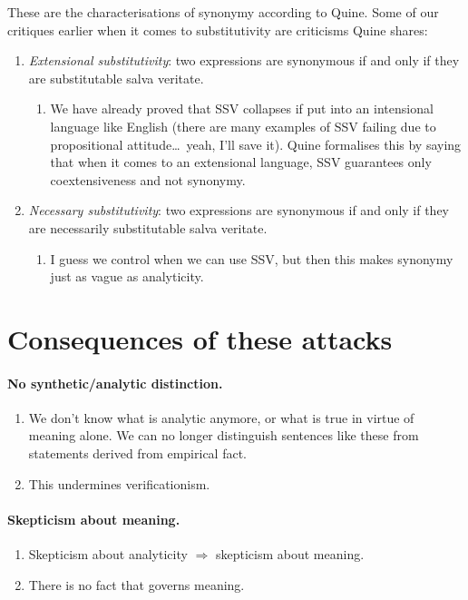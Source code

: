 These are the characterisations of synonymy according to Quine. Some of our critiques earlier when it comes to substitutivity are criticisms Quine shares:
\begin{enumerate}
  \item \emph{Extensional substitutivity}: two expressions are synonymous if and only if they are substitutable salva veritate.
  \begin{enumerate}[label=(\alph*)]
    \item We have already proved that SSV collapses if put into an intensional language like English (there are many examples of SSV failing due to propositional attitude\ldots\ yeah, I'll save it). Quine formalises this by saying that when it comes to an extensional language, SSV guarantees only coextensiveness and not synonymy.
  \end{enumerate}
  \item \emph{Necessary substitutivity}: two expressions are synonymous if and only if they are necessarily substitutable salva veritate.
  \begin{enumerate}[label=(\alph*)]
    \item I guess we control when we can use SSV, but then this makes synonymy just as vague as analyticity.
  \end{enumerate}
\end{enumerate}

\section{Consequences of these attacks}

\paragraph{No synthetic/analytic distinction.}
\begin{enumerate}
  \item We don't know what is analytic anymore, or what is true in virtue of meaning alone. We can no longer distinguish sentences like these from statements derived from empirical fact.
  \item This undermines verificationism.
\end{enumerate}

\paragraph{Skepticism about meaning.}
\begin{enumerate}
  \item Skepticism about analyticity $\Rightarrow$ skepticism about meaning.
  \item There is no fact that governs meaning.
\end{enumerate}

